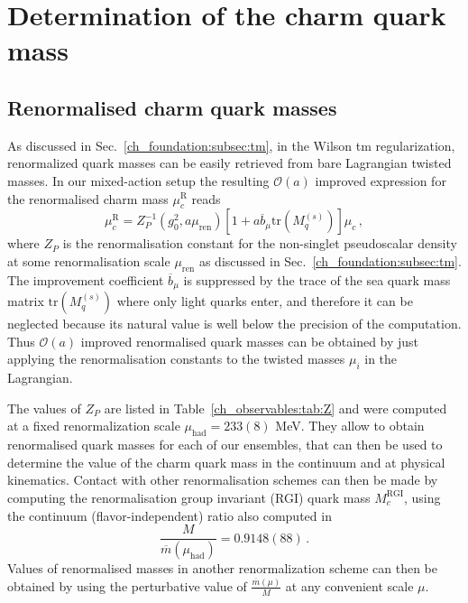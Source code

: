 \section{Determination of the charm quark mass}
\label{sec:mc}

\subsection{Renormalised charm quark masses}

%
As discussed in Sec.~\ref{ch_foundation:subsec:tm}, in the Wilson tm regularization, renormalized quark masses can be easily retrieved from bare Lagrangian twisted masses. In our mixed-action setup the resulting $\mathcal{O}(a)$ improved expression for the renormalised  charm mass $\mu^{\textrm{R}}_c$ reads
\begin{equation}
	\mu^{\textrm{R}}_c=Z_P^{-1}(g_0^2,a\mu_{\textrm{ren}})\left[1+a\overline{b}_\mu\textrm{tr}\left(M_q^{(s)}\right)\right]\mu_c\,,
	\label{eq:renormalised_charm_mass}
\end{equation}
where $Z_P$ is the renormalisation constant for the non-singlet
pseudoscalar density at some renormalisation scale $\mu_{\textrm{ren}}$ as discussed in Sec.~\ref{ch_foundation:subsec:tm}.
%
The improvement coefficient $\overline{b}_{\mu}$ is suppressed by the trace of the sea quark mass matrix $\textrm{tr}\left(M_q^{(s)}\right)$ where only light quarks enter, and therefore it can be neglected because its natural value is well below the precision of the computation. Thus $\mathcal{O}(a)$ improved renormalised quark masses can be obtained by just applying the renormalisation constants to the twisted masses $\mu_i$ in the Lagrangian.
%

The values of $Z_P$ are listed in Table~\ref{ch_observables:tab:Z} and were computed at a fixed renormalization scale $\mu_{\textrm{had}}=233(8)$ MeV. They allow to obtain renormalised quark masses for each of our ensembles, that can then
be used to determine the value of the charm quark mass in the continuum and at physical kinematics.
%
Contact with other renormalisation schemes can then be made by computing the renormalisation
group invariant (RGI) quark mass $M_c^{\mathrm{RGI}}$, using the continuum (flavor-independent)
ratio also computed in~\cite{Campos:2018ahf}
\begin{equation}
	\frac{M}{\overline{m}(\mu_{\mathrm{had}})} = 0.9148(88)\,.
	\label{eq:rgi_running_factor}
\end{equation}
%
Values of renormalised masses in another renormalization scheme can then be obtained by
using the perturbative value of $\frac{\overline{m}(\mu)}{M}$ at any convenient scale $\mu$.
%

